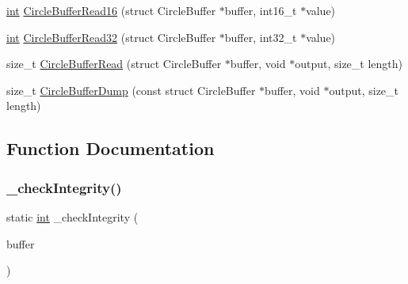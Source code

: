 \begin{DoxyCompactItemize}
\item 
\mbox{\hyperlink{ioapi_8h_a787fa3cf048117ba7123753c1e74fcd6}{int}} \mbox{\hyperlink{circle-buffer_8c_a6379e58465082beba80dc4da5885e39f}{Circle\+Buffer\+Read16}} (struct Circle\+Buffer $\ast$buffer, int16\+\_\+t $\ast$value)
\item 
\mbox{\hyperlink{ioapi_8h_a787fa3cf048117ba7123753c1e74fcd6}{int}} \mbox{\hyperlink{circle-buffer_8c_a3f1b62ccdf61258172c305dcb525e31c}{Circle\+Buffer\+Read32}} (struct Circle\+Buffer $\ast$buffer, int32\+\_\+t $\ast$value)
\item 
size\+\_\+t \mbox{\hyperlink{circle-buffer_8c_a1707584743172130e8ad7069926d985d}{Circle\+Buffer\+Read}} (struct Circle\+Buffer $\ast$buffer, void $\ast$output, size\+\_\+t length)
\item 
size\+\_\+t \mbox{\hyperlink{circle-buffer_8c_a13bf863d3a10d3b22cffbe60c1706c33}{Circle\+Buffer\+Dump}} (const struct Circle\+Buffer $\ast$buffer, void $\ast$output, size\+\_\+t length)
\end{DoxyCompactItemize}


\subsection{Function Documentation}
\mbox{\label{circle-buffer_8c_a2916ab7c3aec1de4db02d13b1c6bf197}} 
\subsubsection{\texorpdfstring{\+\_\+check\+Integrity()}{\_checkIntegrity()}}
{\footnotesize\ttfamily static \mbox{\hyperlink{ioapi_8h_a787fa3cf048117ba7123753c1e74fcd6}{int}} \+\_\+check\+Integrity (\begin{DoxyParamCaption}\item[{struct Circle\+Buffer $\ast$}]{buffer }\end{DoxyParamCaption})\hspace{0.3cm}{\ttfamily [static]}}

